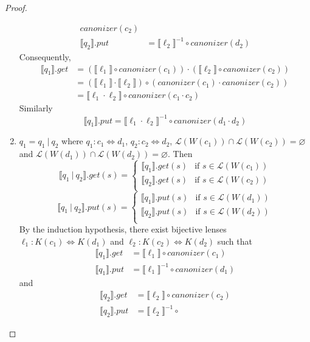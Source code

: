 \documentclass[acmsmall,review,anonymous]{acmart}
\newcommand{\kw}[1]{\ensuremath{\mathit{#1}}}
\newcommand{\sep}{\ensuremath{\ | \ }}
\newcommand{\canonizer}{\ensuremath{\kw{canonizer}}}
\newcommand{\get}{\ensuremath{\kw{get}}}
\newcommand{\lput}{\ensuremath{\kw{put}}}
\begin{document}
\begin{proof}
\begin{enumerate}
\begin{align*}
\canonizer(c_2)\\
\llbracket q_2 \rrbracket.\lput &= {\llbracket \ell_2 \rrbracket}^{-1} \circ
\canonizer(d_2)
\end{align*}
Consequently,
\begin{align*}
\llbracket q_1 \rrbracket.\get &= (\llbracket \ell_1 \rrbracket \circ
\canonizer(c_1)) \cdot  (\llbracket \ell_2 \rrbracket \circ
\canonizer(c_2))\\
&= (\llbracket \ell_1 \rrbracket \cdot \llbracket \ell_2
\rrbracket) \circ (\canonizer(c_1) \cdot \canonizer(c_2))\\
&= \llbracket \ell_1 \cdot  \ell_2 \rrbracket \circ \canonizer(c_1 \cdot c_2)
\end{align*}
Similarly
$$
\llbracket q_1 \rrbracket.\lput = \llbracket \ell_1 \cdot  \ell_2 \rrbracket^{-1}
\circ \canonizer(d_1 \cdot d_2) $$
\item
$q_1 = q_1 \sep q_2$ where $q_1 : c_1 \Leftrightarrow d_1 $, $q_2 : c_2
\Leftrightarrow d_2$, $\mathcal{L}(W(c_1)) \cap \mathcal{L}(W(c_2)) =
\varnothing$ and $\mathcal{L}(W(d_1)) \cap \mathcal{L}(W(d_2)) = \varnothing$.
Then
$$
\llbracket q_1 \sep q_2 \rrbracket.\get(s) =
\begin{cases}
\llbracket q_1 \rrbracket.\get (s) & \text{if } s \in \mathcal{L}(W(c_1))\\
\llbracket q_2 \rrbracket.\get (s) & \text{if } s \in \mathcal{L}(W(c_2))\\
\end{cases}$$
$$\llbracket q_1 \sep q_2 \rrbracket.\lput(s) =
\begin{cases}
\llbracket q_1 \rrbracket.\lput (s) & \text{if } s \in \mathcal{L}(W(d_1))\\
\llbracket q_2 \rrbracket.\lput (s) & \text{if } s \in \mathcal{L}(W(d_2))\\
\end{cases}
$$
By the induction hypothesis, there exist bijective lenses $\ell_1 : K(c_1)
\Leftrightarrow K(d_1)$ and $\ell_2 : K(c_2) \Leftrightarrow K(d_2)$ such that
\begin{align*}
\llbracket q_1 \rrbracket.\get &= \llbracket \ell_1 \rrbracket \circ
\canonizer(c_1)\\
\llbracket q_1 \rrbracket.\lput &= {\llbracket \ell_1 \rrbracket}^{-1} \circ
\canonizer(d_1)
\end{align*}
and
\begin{align*}
\llbracket q_2 \rrbracket.\get &= \llbracket \ell_2 \rrbracket \circ
\canonizer(c_2)\\
\llbracket q_2 \rrbracket.\lput &= {\llbracket \ell_2 \rrbracket}^{-1} \circ

\end{align*}
\end{enumerate}
\end{proof}
\end{document}

